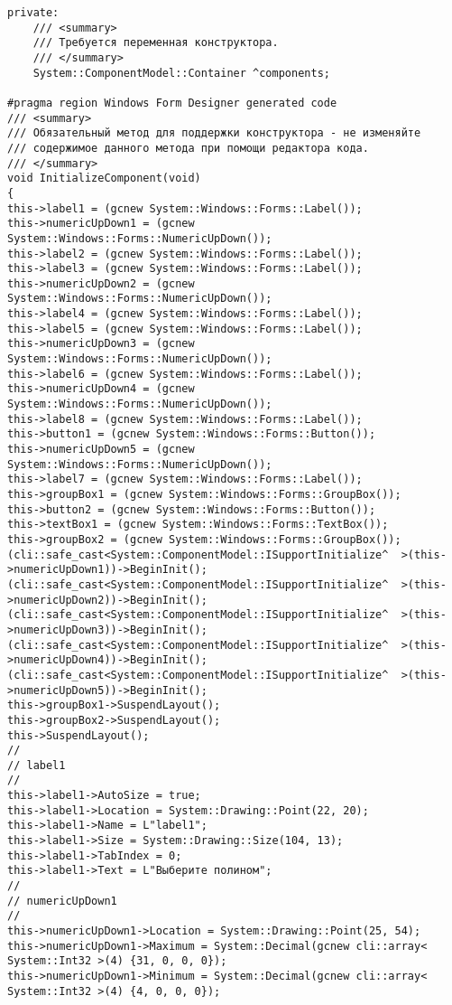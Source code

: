 \begin{lstlisting}[caption = {ОСНОВНАЯ ПОЛЕЗНАЯ ПРОГРАММА}, label = {4.cpp}]
private:
	/// <summary>
	/// Требуется переменная конструктора.
	/// </summary>
	System::ComponentModel::Container ^components;

#pragma region Windows Form Designer generated code
/// <summary>
/// Обязательный метод для поддержки конструктора - не изменяйте
/// содержимое данного метода при помощи редактора кода.
/// </summary>
void InitializeComponent(void)
{
this->label1 = (gcnew System::Windows::Forms::Label());
this->numericUpDown1 = (gcnew System::Windows::Forms::NumericUpDown());
this->label2 = (gcnew System::Windows::Forms::Label());
this->label3 = (gcnew System::Windows::Forms::Label());
this->numericUpDown2 = (gcnew System::Windows::Forms::NumericUpDown());
this->label4 = (gcnew System::Windows::Forms::Label());
this->label5 = (gcnew System::Windows::Forms::Label());
this->numericUpDown3 = (gcnew System::Windows::Forms::NumericUpDown());
this->label6 = (gcnew System::Windows::Forms::Label());
this->numericUpDown4 = (gcnew System::Windows::Forms::NumericUpDown());
this->label8 = (gcnew System::Windows::Forms::Label());
this->button1 = (gcnew System::Windows::Forms::Button());
this->numericUpDown5 = (gcnew System::Windows::Forms::NumericUpDown());
this->label7 = (gcnew System::Windows::Forms::Label());
this->groupBox1 = (gcnew System::Windows::Forms::GroupBox());
this->button2 = (gcnew System::Windows::Forms::Button());
this->textBox1 = (gcnew System::Windows::Forms::TextBox());
this->groupBox2 = (gcnew System::Windows::Forms::GroupBox());
(cli::safe_cast<System::ComponentModel::ISupportInitialize^  >(this->numericUpDown1))->BeginInit();
(cli::safe_cast<System::ComponentModel::ISupportInitialize^  >(this->numericUpDown2))->BeginInit();
(cli::safe_cast<System::ComponentModel::ISupportInitialize^  >(this->numericUpDown3))->BeginInit();
(cli::safe_cast<System::ComponentModel::ISupportInitialize^  >(this->numericUpDown4))->BeginInit();
(cli::safe_cast<System::ComponentModel::ISupportInitialize^  >(this->numericUpDown5))->BeginInit();
this->groupBox1->SuspendLayout();
this->groupBox2->SuspendLayout();
this->SuspendLayout();
// 
// label1
// 
this->label1->AutoSize = true;
this->label1->Location = System::Drawing::Point(22, 20);
this->label1->Name = L"label1";
this->label1->Size = System::Drawing::Size(104, 13);
this->label1->TabIndex = 0;
this->label1->Text = L"Выберите полином";
// 
// numericUpDown1
// 
this->numericUpDown1->Location = System::Drawing::Point(25, 54);
this->numericUpDown1->Maximum = System::Decimal(gcnew cli::array< System::Int32 >(4) {31, 0, 0, 0});
this->numericUpDown1->Minimum = System::Decimal(gcnew cli::array< System::Int32 >(4) {4, 0, 0, 0});

\end{lstlisting}
